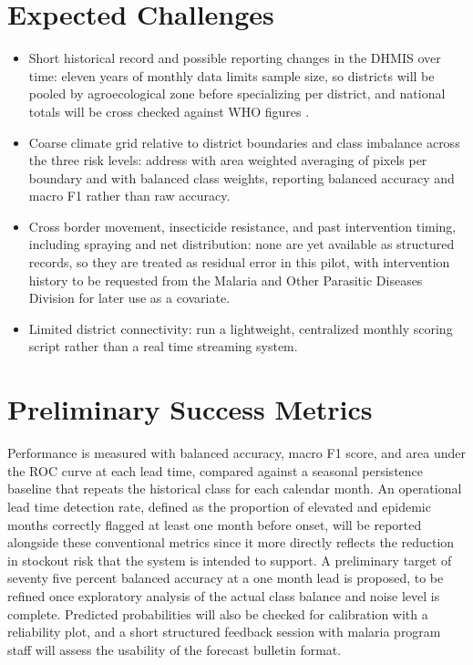 \documentclass[11pt]{article}
\begin{document}
\section{Expected Challenges}
\begin{itemize}
\item Short historical record and possible reporting changes in the DHMIS over time: eleven years of monthly data limits sample size, so districts will be pooled by agroecological zone before specializing per district, and national totals will be cross checked against WHO figures \cite{who2024}.
\item Coarse climate grid relative to district boundaries and class imbalance across the three risk levels: address with area weighted averaging of pixels per boundary and with balanced class weights, reporting balanced accuracy and macro F1 rather than raw accuracy.
\item Cross border movement, insecticide resistance, and past intervention timing, including spraying and net distribution: none are yet available as structured records, so they are treated as residual error in this pilot, with intervention history to be requested from the Malaria and Other Parasitic Diseases Division for later use as a covariate.
\item Limited district connectivity: run a lightweight, centralized monthly scoring script rather than a real time streaming system.
\end{itemize}

\section{Preliminary Success Metrics}
Performance is measured with balanced accuracy, macro F1 score, and area under the ROC curve at each lead time, compared against a seasonal persistence baseline that repeats the historical class for each calendar month. An operational lead time detection rate, defined as the proportion of elevated and epidemic months correctly flagged at least one month before onset, will be reported alongside these conventional metrics since it more directly reflects the reduction in stockout risk that the system is intended to support. A preliminary target of seventy five percent balanced accuracy at a one month lead is proposed, to be refined once exploratory analysis of the actual class balance and noise level is complete. Predicted probabilities will also be checked for calibration with a reliability plot, and a short structured feedback session with malaria program staff will assess the usability of the forecast bulletin format.
\end{document}
